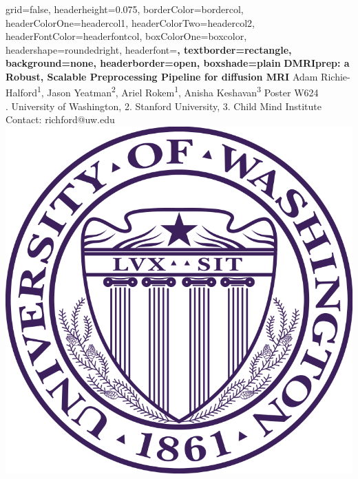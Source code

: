 \documentclass[a0paper,portrait,fontscale=0.395]{baposter}
\begin{document}
\begin{poster}{
grid=false,
headerheight=0.075\textheight,
borderColor=bordercol, %
headerColorOne=headercol1, %
headerColorTwo=headercol2, %
headerFontColor=headerfontcol, %
boxColorOne=boxcolor, %
headershape=roundedright, %
headerfont=\Large\sf\bf, %
textborder=rectangle,
background=none,
headerborder=open, %
boxshade=plain
}
{}
%
%
{\sf\bf DMRIprep: a Robust, Scalable Preprocessing Pipeline for diffusion MRI} %
{\vspace{0.5em} Adam Richie-Halford\textsuperscript{1}, Jason Yeatman\textsuperscript{2}, Ariel Rokem\textsuperscript{1}, Anisha Keshavan\textsuperscript{3} \hfill Poster W624 \hspace{0.5em}\null \\ %
{. University of Washington, 2. Stanford University, 3. Child Mind Institute \hfill Contact: richford@uw.edu \hspace{0.5em}\null}} %
{\includegraphics[scale=0.12]{UWlogo.png}} %


\end{poster}
\end{document}
